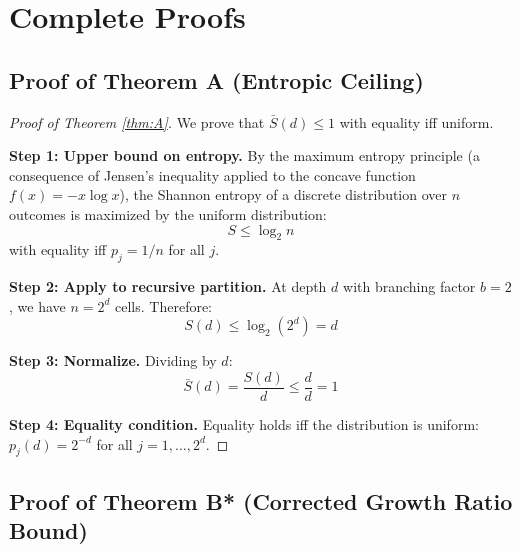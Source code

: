 \documentclass[11pt,a4paper]{article}
\theoremstyle{definition}
\theoremstyle{remark}
\newcommand{\Sbar}{\bar{S}}
\begin{document}
\section{Complete Proofs}
\label{sec:proofs}

\subsection{Proof of Theorem A (Entropic Ceiling)}

\begin{proof}[Proof of Theorem \ref{thm:A}]
We prove that $\Sbar(d) \leq 1$ with equality iff uniform.

\textbf{Step 1: Upper bound on entropy.}
By the maximum entropy principle (a consequence of Jensen's inequality applied to the concave function $f(x) = -x \log x$), the Shannon entropy of a discrete distribution over $n$ outcomes is maximized by the uniform distribution:
\begin{equation}
    S \leq \log_2 n
\end{equation}
with equality iff $p_j = 1/n$ for all $j$.

\textbf{Step 2: Apply to recursive partition.}
At depth $d$ with branching factor $b = 2$, we have $n = 2^d$ cells. Therefore:
\begin{equation}
    S(d) \leq \log_2(2^d) = d
\end{equation}

\textbf{Step 3: Normalize.}
Dividing by $d$:
\begin{equation}
    \Sbar(d) = \frac{S(d)}{d} \leq \frac{d}{d} = 1
\end{equation}

\textbf{Step 4: Equality condition.}
Equality holds iff the distribution is uniform: $p_j(d) = 2^{-d}$ for all $j = 1, \ldots, 2^d$.
\end{proof}

\subsection{Proof of Theorem B* (Corrected Growth Ratio Bound)}
\end{document}
